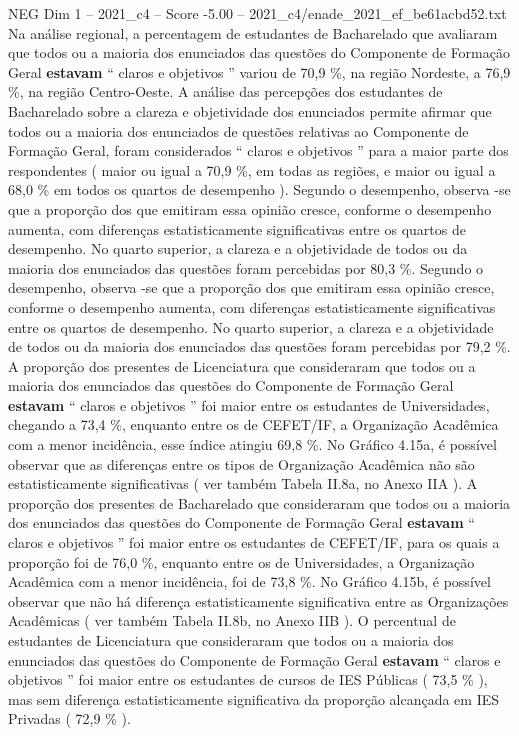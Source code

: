 \begin{textsample}{NEG Dim 1 – 2021\_c4 – Score -5.00 – 2021\_c4/enade\_2021\_ef\_be61acbd52.txt}
Na análise regional, a percentagem de estudantes de Bacharelado que avaliaram que todos ou a maioria dos enunciados das questões do Componente de Formação Geral \textbf{estavam} “ claros e objetivos ” variou de 70,9 \%, na região Nordeste, a 76,9 \%, na região Centro-Oeste.
A análise das percepções dos estudantes de Bacharelado sobre a clareza e objetividade dos enunciados permite afirmar que todos ou a maioria dos enunciados de questões relativas ao Componente de Formação Geral, foram considerados “ claros e objetivos ” para a maior parte dos respondentes ( maior ou igual a 70,9 \%, em todas as regiões, e maior ou igual a 68,0 \% em todos os quartos de desempenho ).
Segundo o desempenho, observa -se que a proporção dos que emitiram essa opinião cresce, conforme o desempenho aumenta, com diferenças estatisticamente significativas entre os quartos de desempenho.
No quarto superior, a clareza e a objetividade de todos ou da maioria dos enunciados das questões foram percebidas por 80,3 \%.
Segundo o desempenho, observa -se que a proporção dos que emitiram essa opinião cresce, conforme o desempenho aumenta, com diferenças estatisticamente significativas entre os quartos de desempenho.
No quarto superior, a clareza e a objetividade de todos ou da maioria dos enunciados das questões foram percebidas por 79,2 \%.
A proporção dos presentes de Licenciatura que consideraram que todos ou a maioria dos enunciados das questões do Componente de Formação Geral \textbf{estavam} “ claros e objetivos ” foi maior entre os estudantes de Universidades, chegando a 73,4 \%, enquanto entre os de CEFET/IF, a Organização Acadêmica com a menor incidência, esse índice atingiu 69,8 \%.
No Gráfico 4.15a, é possível observar que as diferenças entre os tipos de Organização Acadêmica não são estatisticamente significativas ( ver também Tabela II.8a, no Anexo IIA ).
A proporção dos presentes de Bacharelado que consideraram que todos ou a maioria dos enunciados das questões do Componente de Formação Geral \textbf{estavam} “ claros e objetivos ” foi maior entre os estudantes de CEFET/IF, para os quais a proporção foi de 76,0 \%, enquanto entre os de Universidades, a Organização Acadêmica com a menor incidência, foi de 73,8 \%.
No Gráfico 4.15b, é possível observar que não há diferença estatisticamente significativa entre as Organizações Acadêmicas ( ver também Tabela II.8b, no Anexo IIB ).
O percentual de estudantes de Licenciatura que consideraram que todos ou a maioria dos enunciados das questões do Componente de Formação Geral \textbf{estavam} “ claros e objetivos ” foi maior entre os estudantes de cursos de IES Públicas ( 73,5 \% ), mas sem diferença estatisticamente significativa da proporção alcançada em IES Privadas ( 72,9 \% ).

\end{textsample}
